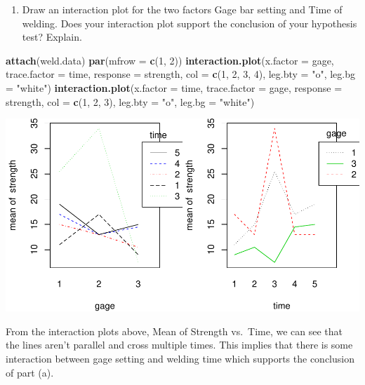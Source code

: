 \documentclass[12pt,]{article}
\newenvironment{Shaded}{\begin{snugshade}}{\end{snugshade}}
\newcommand{\KeywordTok}[1]{\textcolor[rgb]{0.13,0.29,0.53}{\textbf{#1}}}
\newcommand{\DataTypeTok}[1]{\textcolor[rgb]{0.13,0.29,0.53}{#1}}
\newcommand{\DecValTok}[1]{\textcolor[rgb]{0.00,0.00,0.81}{#1}}
\newcommand{\StringTok}[1]{\textcolor[rgb]{0.31,0.60,0.02}{#1}}
\newcommand{\NormalTok}[1]{#1}
\providecommand{\tightlist}{%
  \setlength{\itemsep}{0pt}\setlength{\parskip}{0pt}}
\begin{document}
\begin{enumerate}
\def\labelenumi{(\alph{enumi})}
\setcounter{enumi}{1}
\tightlist
\item
  Draw an interaction plot for the two factors Gage bar setting and Time
  of welding. Does your interaction plot support the conclusion of your
  hypothesis test? Explain.
\end{enumerate}

\begin{Shaded}
\begin{Highlighting}[]
\KeywordTok{attach}\NormalTok{(weld.data)}
\KeywordTok{par}\NormalTok{(}\DataTypeTok{mfrow =} \KeywordTok{c}\NormalTok{(}\DecValTok{1}\NormalTok{, }\DecValTok{2}\NormalTok{))}
\KeywordTok{interaction.plot}\NormalTok{(}\DataTypeTok{x.factor =}\NormalTok{ gage, }\DataTypeTok{trace.factor =}\NormalTok{ time, }\DataTypeTok{response =}\NormalTok{ strength,}
\DataTypeTok{col =} \KeywordTok{c}\NormalTok{(}\DecValTok{1}\NormalTok{, }\DecValTok{2}\NormalTok{, }\DecValTok{3}\NormalTok{, }\DecValTok{4}\NormalTok{), }\DataTypeTok{leg.bty =} \StringTok{"o"}\NormalTok{, }\DataTypeTok{leg.bg =} \StringTok{"white"}\NormalTok{) }
\KeywordTok{interaction.plot}\NormalTok{(}\DataTypeTok{x.factor =}\NormalTok{ time, }\DataTypeTok{trace.factor =}\NormalTok{ gage, }\DataTypeTok{response =}\NormalTok{ strength,}
\DataTypeTok{col =} \KeywordTok{c}\NormalTok{(}\DecValTok{1}\NormalTok{, }\DecValTok{2}\NormalTok{, }\DecValTok{3}\NormalTok{), }\DataTypeTok{leg.bty =} \StringTok{"o"}\NormalTok{, }\DataTypeTok{leg.bg =} \StringTok{"white"}\NormalTok{)}
\end{Highlighting}
\end{Shaded}

\includegraphics{Markdown_HW_6_files/figure-latex/unnamed-chunk-7-1.pdf}

From the interaction plots above, Mean of Strength vs.~Time, we can see
that the lines aren't parallel and cross multiple times. This implies
that there is some interaction between gage setting and welding time
which supports the conclusion of part (a).
\end{document}
